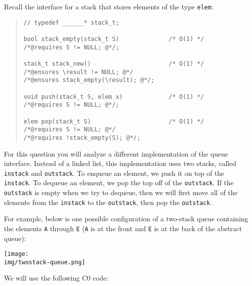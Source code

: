\clearpage
{}

Recall the interface for a stack that stores
elements of the type \lstinline'elem':

\begin{quote}
\begin{lstlisting}
// typedef ______* stack_t;

bool stack_empty(stack_t S)              /* O(1) */
/*@requires S != NULL; @*/;

stack_t stack_new()                      /* O(1) */
/*@ensures \result != NULL; @*/
/*@ensures stack_empty(\result); @*/;

void push(stack_t S, elem x)             /* O(1) */
/*@requires S != NULL; @*/;

elem pop(stack_t S)                      /* O(1) */
/*@requires S != NULL; @*/
/*@requires !stack_empty(S); @*/;
\end{lstlisting}
\end{quote}

For this question you will analyze a different implementation of the
queue interface. Instead of a linked list, this implementation uses
two stacks, called \lstinline'instack' and \lstinline'outstack'. To
enqueue an element, we push it on top of the \lstinline'instack'. To
dequeue an element, we pop the top off of the \lstinline'outstack'. If
the \lstinline'outstack' is empty when we try to dequeue, then we will
first move all of the elements from the \lstinline'instack' to
the \lstinline'outstack', then pop the \lstinline'outstack'.

For example, below is one possible configuration of a two-stack queue
containing the elements \lstinline'A' through \lstinline'E' (\lstinline'A' is
at the front and \lstinline'E' is at the back of the abstract queue):
\begin{center}
\texttt{[image: \\img/twostack-queue.png]}
\end{center}

We will use the following C0 code:

